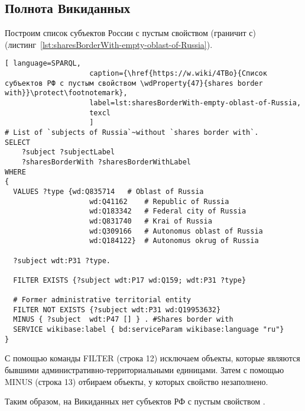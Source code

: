 \subsection{Полнота Викиданных}

Построим список субъектов России с пустым свойством  (граничит с) (листинг~\protect\ref{lst:sharesBorderWith-empty-oblast-of-Russia}).

\lstset{numbers=left, firstnumber=1, frame=single}
\begin{lstlisting}[ language=SPARQL, 
                    caption={\href{https://w.wiki/4TBo}{Список субъектов РФ с пустым свойством \wdProperty{47}{shares border with}}\protect\footnotemark},
                    label=lst:sharesBorderWith-empty-oblast-of-Russia,
                    texcl 
                    ]
# List of `subjects of Russia`~without `shares border with`. 
SELECT 
    ?subject ?subjectLabel 
    ?sharesBorderWith ?sharesBorderWithLabel
WHERE
{
  VALUES ?type {wd:Q835714   # Oblast of Russia
                    wd:Q41162    # Republic of Russia
                    wd:Q183342   # Federal city of Russia
                    wd:Q831740   # Krai of Russia
                    wd:Q309166   # Autonomus oblast of Russia
                    wd:Q184122}  # Autonomus okrug of Russia
  
  ?subject wdt:P31 ?type.
  
  FILTER EXISTS {?subject wdt:P17 wd:Q159; wdt:P31 ?type}
  
  # Former administrative territorial entity
  FILTER NOT EXISTS {?subject wdt:P31 wd:Q19953632} 
  MINUS { ?subject  wdt:P47 [] } . #Shares border with 
  SERVICE wikibase:label { bd:serviceParam wikibase:language "ru"}
}
\end{lstlisting}%

С помощью команды FILTER (строка 12) исключаем объекты, которые являются бывшими административно-территориальными единицами. Затем с помощью MINUS (строка 13) отбираем объекты, у которых свойство  незаполнено.

Таким образом, на Викиданных нет субъектов РФ с пустым свойством .

